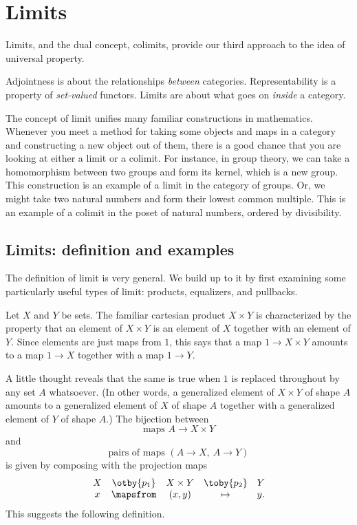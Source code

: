 \chapter{Limits}
\label{ch:lims}


Limits, and the dual concept, colimits, provide our third approach to the
idea of universal property.  

Adjointness is about the relationships \emph{between} categories.
Representability is a property of \emph{set-valued} functors.  Limits are
about what goes on \emph{inside} a category.

The concept of limit unifies many familiar constructions in mathematics.
Whenever you meet a method for taking some objects and maps in a category
and constructing a new object out of them, there is a good chance that you
are looking at either a limit or a colimit.  For instance, in group theory,
we can take a homomorphism between two groups and form its kernel, which
is a new group.  This construction is an example of a limit in the category
of groups.  Or, we might take two natural numbers and form their lowest
common multiple.  This is an example of a colimit in the poset of natural
numbers, ordered by divisibility.



\section{Limits: definition and examples}
\label{sec:lims-basics}


The definition of limit is very general.  We build up to it by first
examining some particularly useful types of limit: products, equalizers,
and pullbacks.




Let $X$ and $Y$ be sets.  The familiar cartesian product%
%
%
$X \times Y$ is characterized by the property that an element of $X \times
Y$ is an element of $X$ together with an element of $Y$.  Since elements
are just maps from $1$, this says that a map $1 \to X \times Y$ amounts to
a map $1 \to X$ together with a map $1 \to Y$.

A little thought reveals that the same is true when $1$ is replaced
throughout by any set $A$ whatsoever.  (In other words, a generalized
element of $X \times Y$ of shape $A$ amounts to a generalized element of
$X$ of shape $A$ together with a generalized element of $Y$ of shape $A$.)
The bijection between
\[
\text{maps } A \to X \times Y
\]
and
\[
\text{pairs of maps } (A \to X,\ A \to Y)
\]
is given by composing with the projection maps
\[
\begin{array}{ccccc}
X       &\otby{p_1}     &X \times Y     &\toby{p_2}     &Y      \\
x       &\mapsfrom      &(x, y)         &\mapsto        &y.
\end{array}
\]
This suggests the following definition.


